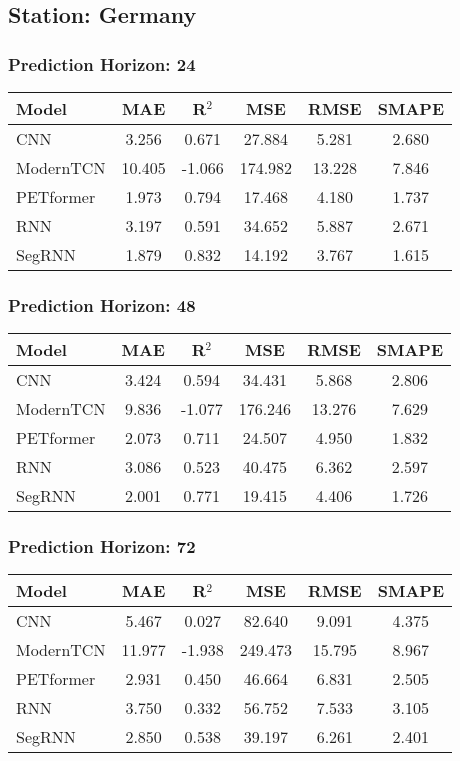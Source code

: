 \subsection*{Station: Germany}
\subsubsection*{Prediction Horizon: 24}
\begin{tabular}{lccccc}
\toprule
Model & MAE & R$^2$ & MSE & RMSE & SMAPE \\
\midrule
CNN & 3.256 & 0.671 & 27.884 & 5.281 & 2.680 \\
ModernTCN & 10.405 & -1.066 & 174.982 & 13.228 & 7.846 \\
PETformer & 1.973 & 0.794 & 17.468 & 4.180 & 1.737 \\
RNN & 3.197 & 0.591 & 34.652 & 5.887 & 2.671 \\
SegRNN & 1.879 & 0.832 & 14.192 & 3.767 & 1.615 \\
\bottomrule
\end{tabular}
\vspace{0.5cm}
\subsubsection*{Prediction Horizon: 48}
\begin{tabular}{lccccc}
\toprule
Model & MAE & R$^2$ & MSE & RMSE & SMAPE \\
\midrule
CNN & 3.424 & 0.594 & 34.431 & 5.868 & 2.806 \\
ModernTCN & 9.836 & -1.077 & 176.246 & 13.276 & 7.629 \\
PETformer & 2.073 & 0.711 & 24.507 & 4.950 & 1.832 \\
RNN & 3.086 & 0.523 & 40.475 & 6.362 & 2.597 \\
SegRNN & 2.001 & 0.771 & 19.415 & 4.406 & 1.726 \\
\bottomrule
\end{tabular}
\vspace{0.5cm}
\subsubsection*{Prediction Horizon: 72}
\begin{tabular}{lccccc}
\toprule
Model & MAE & R$^2$ & MSE & RMSE & SMAPE \\
\midrule
CNN & 5.467 & 0.027 & 82.640 & 9.091 & 4.375 \\
ModernTCN & 11.977 & -1.938 & 249.473 & 15.795 & 8.967 \\
PETformer & 2.931 & 0.450 & 46.664 & 6.831 & 2.505 \\
RNN & 3.750 & 0.332 & 56.752 & 7.533 & 3.105 \\
SegRNN & 2.850 & 0.538 & 39.197 & 6.261 & 2.401 \\
\bottomrule
\end{tabular}
\vspace{0.5cm}